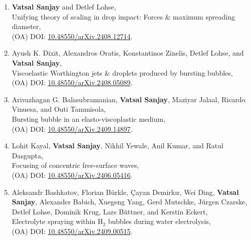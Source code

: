 \documentclass[11pt,a4paper,roman,english,colorlinks,linkcolor={red!50!black}]{moderncv}
\begin{document}
\begin{enumerate}[leftmargin=0.75cm]
	\item \textbf{Vatsal Sanjay} and Detlef Lohse,\\
	Unifying theory of scaling in drop impact: Forces \& maximum spreading diameter,\\
	(OA) DOI: \href{https://doi.org/10.48550/arXiv.2408.12714}{10.48550/arXiv.2408.12714}.

	\item Ayush K. Dixit, Alexandros Oratis, Konstantinos Zinelis, Detlef Lohse, and \textbf{Vatsal Sanjay},\\
	Viscoelastic Worthington jets \& droplets produced by bursting bubbles,\\
	(OA) DOI: \href{https://doi.org/10.48550/arXiv.2408.05089}{10.48550/arXiv.2408.05089}.

	\item Arivazhagan G. Balasubramanian, \textbf{Vatsal Sanjay}, Maziyar Jalaal, Ricardo Vinuesa, and Outi Tammisola,\\
	Bursting bubble in an elasto-viscoplastic medium,\\
	(OA) DOI: \href{https://doi.org/10.48550/arXiv.2409.14897}{10.48550/arXiv.2409.14897}.

	\item Lohit Kayal, \textbf{Vatsal Sanjay}, Nikhil Yewale, Anil Kumar, and Ratul Dasgupta,\\
	Focusing of concentric free-surface waves,\\
	(OA) DOI: \href{https://doi.org/10.48550/arXiv.2406.05416}{10.48550/arXiv.2406.05416}.

	\item Aleksandr Bashkatov, Florian Bürkle, Çayan Demirkır, Wei Ding, \textbf{Vatsal Sanjay}, Alexander Babich, Xuegeng Yang, Gerd Mutschke, Jürgen Czarske, Detlef Lohse, Dominik Krug, Lars Büttner, and Kerstin Eckert,\\
	Electrolyte spraying within H$_2$ bubbles during water electrolysis,\\
	(OA) DOI: \href{https://doi.org/10.48550/arXiv.2409.00515}{10.48550/arXiv.2409.00515}.

\end{enumerate}
\end{document}
